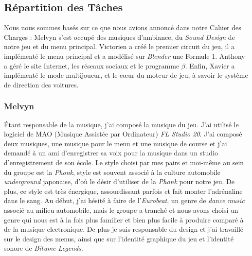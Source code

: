 \documentclass[12pt,a4paper]{article}
\newcommand{\btmlgs}{\textsl{Bitume Legends}}
\begin{document}
    \subsection{Répartition des Tâches}
        Nous nous sommes basés sur ce que nous avions annoncé dans notre Cahier des Charges :
        Melvyn s'est occupé des musiques d'ambiance, du \textit{Sound Design} de 
        notre jeu et du menu principal. Victorien a créé le premier circuit du jeu,
        il a implémenté le menu principal et a modélisé sur \textsl{Blender} une Formule 1.
        Anthony a géré le site Internet, les réseaux sociaux et le programme \(\beta\).
        Enfin, Xavier a implémenté le mode multijoueur, et le cœur du moteur de jeu,
        à savoir le système de direction des voitures.

    \subsubsection{Melvyn}
        Étant responsable de la musique, j'ai composé la 
        musique du jeu. J'ai utilisé le logiciel de MAO (Musique Assistée par Ordinateur) 
        \textsl{FL Studio 20}. J'ai composé deux musiques, une musique pour le menu et 
        une musique de course et j'ai demandé à un ami d'enregistrer sa voix pour la musique
        dans un studio d'enregistrement de son école. Le style choisi par mes pairs et moi-même
        au sein du groupe est la \textsl{Phonk}, style est souvent associé à la culture automobile
        \textit{underground} japonaise, d'où le désir d'utiliser de la \textsl{Phonk} pour notre jeu. 
        De plus, ce style est très énergique, assourdissant parfois et fait monter l'adrénaline
        dans le sang. Au début, j'ai hésité à faire de l'\textit{Eurobeat}, un genre de \textit{dance music}
        associé au milieu automobile, mais le groupe a tranché et nous avons choisi un genre qui
        nous est à la fois plus familier et bien plus facile à produire comparé à de la musique
        electronique. De plus je suis responsable du design et j'ai travaillé sur le design des
        menus, ainsi que sur l'identité graphique du jeu et l'identité sonore de \btmlgs.
\end{document}
